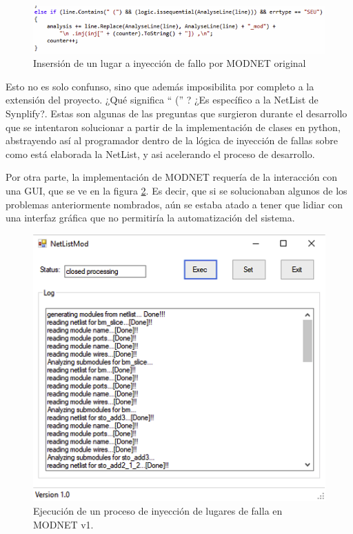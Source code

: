 \begin{figure}[H]
	\centering
	\includegraphics[width=\linewidth, frame ]{img/modnet_gui_5.png}
	\caption{ Insersión de un lugar a inyección de fallo por MODNET original}
	\label{modnet_gui_5}
\end{figure}

Esto no es solo confunso, sino que además imposibilita por completo a la extensión del proyecto. ¿Qué significa `` ('' ? ¿Es específico a la NetList de Synplify?. Estas son algunas de las preguntas que surgieron durante el desarrollo que se intentaron solucionar a partir de la implementación de clases en python, abstrayendo así al programador dentro de la lógica de inyección de fallas sobre como está elaborada la NetList, y asi acelerando el proceso de desarrollo.

Por otra parte, la implementación de MODNET requería de la interacción con una GUI, que se ve en la figura \ref{modnet_gui_4}. Es decir, que si se solucionaban algunos de los problemas anteriormente nombrados, aún se estaba atado a tener que lidiar con una interfaz gráfica que no permitiría la automatización del sistema.

\begin{figure}[H]
	\centering
	\includegraphics[width=0.6 \textwidth, frame]{img/modnet_gui_4.png}
	\caption{Ejecución de un proceso de inyección de lugares de falla en MODNET v1.}
	\label{modnet_gui_4}
\end{figure}

